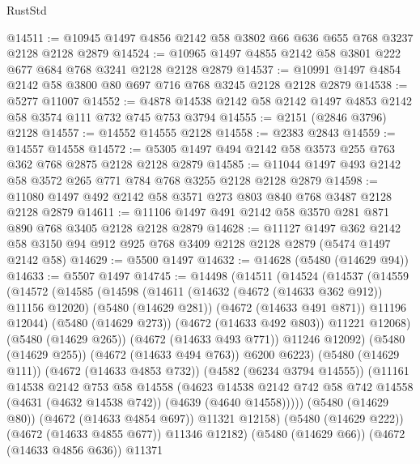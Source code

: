 \begin{lexlean}{RustStd}
\begin{coremodule}
{\begin{coremodule}
{{{{{{{{{{{{{{{{@14511 := @10945 @1497 @4856 @2142 @58 @3802 @66 @636 @655 @768 @3237 @2128 @2128 @2879
@14524 := @10965 @1497 @4855 @2142 @58 @3801 @222 @677 @684 @768 @3241 @2128 @2128 @2879
@14537 := @10991 @1497 @4854 @2142 @58 @3800 @80 @697 @716 @768 @3245 @2128 @2128 @2879
@14538 := @5277 @11007
@14552 := @4878 @14538 @2142 @58 @2142 @1497 @4853 @2142 @58 @3574 @111 @732 @745 @753 @3794
@14555 := @2151 (@2846 @3796) @2128
@14557 := @14552 @14555 @2128
@14558 := @2383 @2843
@14559 := @14557 @14558
@14572 := @5305 @1497 @494 @2142 @58 @3573 @255 @763 @362 @768 @2875 @2128 @2128 @2879
@14585 := @11044 @1497 @493 @2142 @58 @3572 @265 @771 @784 @768 @3255 @2128 @2128 @2879
@14598 := @11080 @1497 @492 @2142 @58 @3571 @273 @803 @840 @768 @3487 @2128 @2128 @2879
@14611 := @11106 @1497 @491 @2142 @58 @3570 @281 @871 @890 @768 @3405 @2128 @2128 @2879
@14628 := @11127
    @1497
    @362
    @2142
    @58
    @3150
    @94
    @912
    @925
    @768
    @3409
    @2128
    @2128
    @2879
    (@5474 @1497 @2142 @58)
@14629 := @5500 @1497
@14632 := @14628 (@5480 (@14629 @94))
@14633 := @5507 @1497
@14745 := @14498
    (@14511
      (@14524
        (@14537
          (@14559
            (@14572
              (@14585
                (@14598
                  (@14611
                    (@14632 (@4672 (@14633 @362 @912)) @11156 @12020)
                    (@5480 (@14629 @281))
                    (@4672 (@14633 @491 @871))
                    @11196
                    @12044)
                  (@5480 (@14629 @273))
                  (@4672 (@14633 @492 @803))
                  @11221
                  @12068)
                (@5480 (@14629 @265))
                (@4672 (@14633 @493 @771))
                @11246
                @12092)
              (@5480 (@14629 @255))
              (@4672 (@14633 @494 @763))
              @6200
              @6223)
            (@5480 (@14629 @111))
            (@4672 (@14633 @4853 @732))
            (@4582 (@6234 @3794 @14555))
            (@11161
              @14538
              @2142
              @753
              @58
              @14558
              (@4623
                @14538
                @2142
                @742
                @58
                @742
                @14558
                (@4631 (@4632 @14538 @742))
                (@4639 (@4640 @14558)))))
          (@5480 (@14629 @80))
          (@4672 (@14633 @4854 @697))
          @11321
          @12158)
        (@5480 (@14629 @222))
        (@4672 (@14633 @4855 @677))
        @11346
        @12182)
      (@5480 (@14629 @66))
      (@4672 (@14633 @4856 @636))
      @11371
}}}}}}}}}}}}}}}}
\end{coremodule}}
\end{coremodule}
\end{lexlean}
